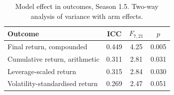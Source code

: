 \begin{table}[ht]
\centering
\small
\caption{Model effect in outcomes, Season 1.5. Two-way analysis of variance with arm effects.}
\label{tab:scale}
\begin{tabular}{lccc}
\toprule
Outcome & ICC & $F_{7,21}$ & $p$ \\
\midrule
Final return, compounded & 0.449 & 4.25 & 0.005 \\
Cumulative return, arithmetic & 0.311 & 2.81 & 0.031 \\
Leverage-scaled return & 0.315 & 2.84 & 0.030 \\
Volatility-standardised return & 0.269 & 2.47 & 0.051 \\
\bottomrule
\end{tabular}
\end{table}
